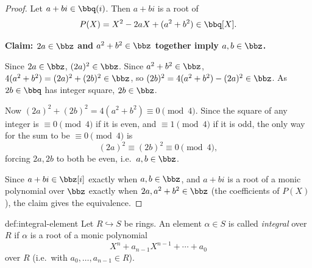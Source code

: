 \begin{proof}
Let $a + bi \in \bbq(i)$. Then $a+bi$ is a root of
\[
P(X) = X^2 - 2aX + (a^2+b^2) \in \bbq[X].
\]

\textbf{Claim: $2a \in \bbz$ and $a^2+b^2 \in \bbz$ together imply $a, b \in \bbz$.}

Since $2a \in \bbz$, $(2a)^2 \in \bbz$. Since $a^2+b^2 \in \bbz$, $4(a^2+b^2) = (2a)^2 + (2b)^2 \in \bbz$, so $(2b)^2 = 4(a^2+b^2) - (2a)^2 \in \bbz$. As $2b \in \bbq$ has integer square, $2b \in \bbz$.

Now $(2a)^2 + (2b)^2 = 4(a^2+b^2) \equiv 0 \pmod 4$. Since the square of any integer is $\equiv 0 \pmod 4$ if it is even, and $\equiv 1 \pmod 4$ if it is odd, the only way for the sum to be $\equiv 0 \pmod 4$ is
\[
(2a)^2 \equiv (2b)^2 \equiv 0 \pmod 4,
\]
forcing $2a, 2b$ to both be even, i.e.\ $a, b \in \bbz$.

Since $a+bi \in \bbz[i]$ exactly when $a, b \in \bbz$, and $a+bi$ is a root of a monic polynomial over $\bbz$ exactly when $2a, a^2+b^2 \in \bbz$ (the coefficients of $P(X)$), the claim gives the equivalence.
\end{proof}

\begin{definition}{}{def:integral-element}
Let $R \hookrightarrow S$ be rings. An element $\alpha \in S$ is called \emph{integral} over $R$ if $\alpha$ is a root of a monic polynomial
\[
X^n + a_{n-1}X^{n-1} + \cdots + a_0
\]
over $R$ (i.e.\ with $a_0, \ldots, a_{n-1} \in R$).
\end{definition}